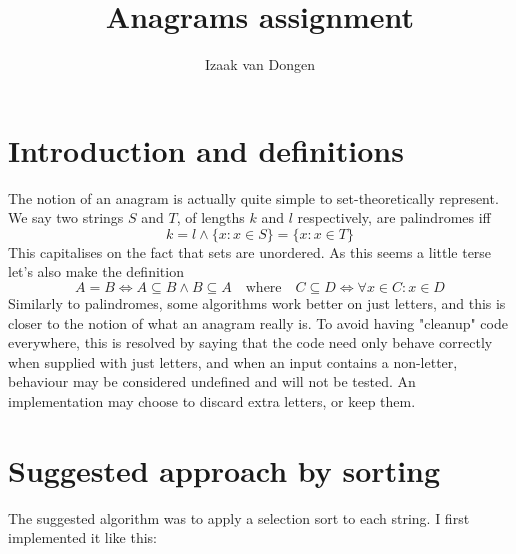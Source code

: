 \documentclass[fleqn,a4paper,11pt]{article}
\title{Anagrams assignment}
\author{Izaak van Dongen}
\begin{document}
    \maketitle\thispagestyle{empty} %
    \tableofcontents

    \section{Introduction and definitions}

    The notion of an anagram is actually quite simple to set-theoretically
    represent. We say two strings \(S\) and \(T\), of lengths \(k\) and \(l\)
    respectively, are palindromes iff
    \begin{equation}
        k = l \land \{x: x \in S\} = \{x: x \in T\}
    \end{equation}
    This capitalises on the fact that sets are unordered. As this seems a
    little terse let's also make the definition
    \begin{equation}
        A = B \iff A \subseteq B \land B \subseteq A \quad
            \text{where} \quad
            C \subseteq D \iff \forall x \in C: x \in D
    \end{equation}
    Similarly to palindromes, some algorithms work better on just letters, and
    this is closer to the notion of what an anagram really is. To avoid having
    "cleanup" code everywhere, this is resolved by saying that the code need
    only behave correctly when supplied with just letters, and when an input
    contains a non-letter, behaviour may be considered undefined and will not
    be tested. An implementation may choose to discard extra letters, or keep
    them.

    \section{Suggested approach by sorting}

    The suggested algorithm was to apply a selection sort to each string. I
    first implemented it like this:
\end{document}
